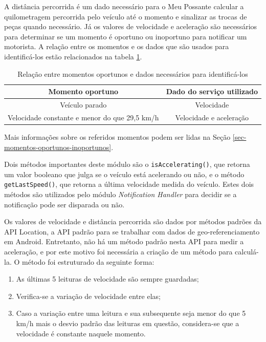 A distância percorrida é um dado necessário para o Meu Possante calcular a quilometragem percorrida pelo veículo até o momento e
sinalizar as trocas de peças quando necessário. Já os valores de velocidade e aceleração são necessários para determinar se um
momento é oportuno ou inoportuno para notificar um motorista. A relação entre os momentos e os dados que são usados para
identificá-los estão relacionados na tabela \ref{tabela-momentos-dados}.

\begin{table}[h]
\centering
\caption{Relação entre momentos oportunos e dados necessários para identificá-los}
\label{tabela-momentos-dados}
\begin{tabular}{|c|c|}
\hline
\textbf{Momento oportuno}                     & \textbf{Dado do serviço utilizado} \\ \hline
Veículo parado                                & Velocidade                         \\ \hline
Velocidade constante e menor do que 29,5 km/h & Velocidade e aceleração            \\ \hline
\end{tabular}
\end{table}

Mais informações sobre os referidos momentos podem ser lidas na Seção \ref{sec-momentos-oportunos-inoportunos}.

Dois métodos importantes deste módulo são o \lstinline[basicstyle=\ttfamily\color{black}]|isAccelerating()|, que retorna um valor
booleano que julga se o veículo está acelerando ou não, e o método \lstinline[basicstyle=\ttfamily\color{black}]|getLastSpeed()|, que
retorna a última velocidade medida do veículo. Estes dois métodos são utilizados pelo módulo \textit{Notification Handler} para decidir se
a notificação pode ser disparada ou não.

Os valores de velocidade e distância percorrida são dados por métodos padrões da API Location, a API padrão para se trabalhar
com dados de geo-referenciamento em Android. Entretanto, não há um método padrão nesta API para medir a aceleração, e por este
motivo foi necessária a criação de um método para calculá-la. O método foi estruturado da seguinte forma:

\begin{enumerate}
  \item As últimas 5 leituras de velocidade são sempre guardadas;
  \item Verifica-se a variação de velocidade entre elas;
  \item Caso a variação entre uma leitura e sua subsequente seja menor do que 5 km/h mais o desvio padrão das leituras em questão,
  considera-se que a velocidade é constante naquele momento.
\end{enumerate}

